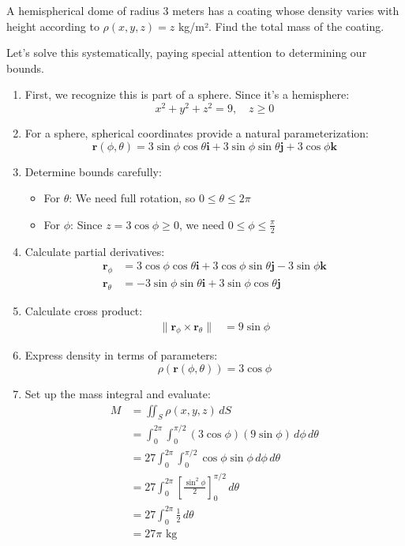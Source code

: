 \exampleline
\begin{example}
A hemispherical dome of radius 3 meters has a coating whose density varies with height according to $\rho(x,y,z) = z$ kg/m². Find the total mass of the coating.

\begin{solution}
Let's solve this systematically, paying special attention to determining our bounds.

\begin{enumerate}
   \item First, we recognize this is part of a sphere. Since it's a hemisphere:
   \[
   x^2 + y^2 + z^2 = 9, \quad z \geq 0
   \]

   \item For a sphere, spherical coordinates provide a natural parameterization:
   \[
   \mathbf{r}(\phi,\theta) = 3\sin\phi\cos\theta\mathbf{i} + 3\sin\phi\sin\theta\mathbf{j} + 3\cos\phi\mathbf{k}
   \]
   
   \item Determine bounds carefully:
       \begin{itemize}
           \item For $\theta$: We need full rotation, so $0 \leq \theta \leq 2\pi$
           \item For $\phi$: Since $z = 3\cos\phi \geq 0$, we need $0 \leq \phi \leq \frac{\pi}{2}$
       \end{itemize}

   \item Calculate partial derivatives:
   \begin{align*}
       \mathbf{r}_\phi &= 3\cos\phi\cos\theta\mathbf{i} + 3\cos\phi\sin\theta\mathbf{j} - 3\sin\phi\mathbf{k} \\
       \mathbf{r}_\theta &= -3\sin\phi\sin\theta\mathbf{i} + 3\sin\phi\cos\theta\mathbf{j}
   \end{align*}

   \item Calculate cross product:
   \begin{align*}
       \|\mathbf{r}_\phi \times \mathbf{r}_\theta\| &= 9\sin\phi
   \end{align*}

   \item Express density in terms of parameters:
   \[
   \rho(\mathbf{r}(\phi,\theta)) = 3\cos\phi
   \]

   \item Set up the mass integral and evaluate:
   \begin{align*}
       M &= \iint_S \rho(x,y,z)\,dS \\
       &= \int_0^{2\pi}\int_0^{\pi/2} (3\cos\phi)(9\sin\phi)\,d\phi\,d\theta \\
       &= 27\int_0^{2\pi}\int_0^{\pi/2} \cos\phi\sin\phi\,d\phi\,d\theta \\
       &= 27\int_0^{2\pi}\left[\frac{\sin^2\phi}{2}\right]_0^{\pi/2}\,d\theta \\
       &= 27\int_0^{2\pi}\frac{1}{2}\,d\theta \\
       &= 27\pi \text{ kg}
   \end{align*}
\end{enumerate}


\end{solution}
\end{example}
